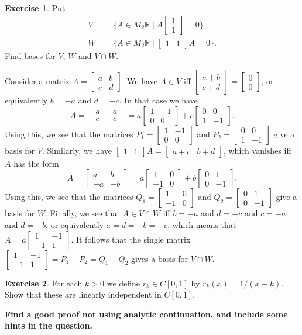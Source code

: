 \documentclass[a4paper]{amsart}
\newcommand{\R}         {{\mathbb{R}}}
\newcommand{\bpm}       {\left[\begin{matrix}}
\newcommand{\epm}       {\end{matrix}\right]}
\newcommand{\st}        {\;|\;}
\renewcommand{\:}{\colon}
\theoremstyle{definition}
\newtheorem{exercise}{Exercise}
\newenvironment{solution}{{\noindent \bf Solution:}}{}
\begin{document}
\begin{exercise}
 Put
 \begin{align*}
  V &= \{A\in M_2\R\st A\bpm 1\\1\epm = 0 \} \\
  W &= \{A\in M_2\R\st \bpm 1&1\epm A = 0 \}. 
 \end{align*} 
 Find bases for $V$, $W$ and $V\cap W$.
\end{exercise}
\begin{solution}
 Consider a matrix $A=\bpm a&b \\ c&d\epm$.  We have $A\in V$ iff
 $\bpm a+b\\ c+d\epm=\bpm 0\\0\epm$, or equivalently $b=-a$ and
 $d=-c$.  In that case we have
 \[ A = \bpm a&-a\\ c&-c\epm = 
        a\bpm 1&-1\\0&0\epm + c\bpm 0&0\\1&-1 \epm.
 \]
 Using this, we see that the matrices $P_1=\bpm 1&-1\\0&0\epm$ and
 $P_2=\bpm 0&0\\1&-1\epm$ give a basis for $V$.  Similarly, we have
 $\bpm 1&1\epm A=\bpm a+c&b+d\epm$, which vanishes iff $A$ has
 the form 
 \[ A = \bpm a&b\\ -a&-b\epm =
     a\bpm 1&0\\-1&0\epm + b\bpm 0&1\\ 0&-1\epm.
 \]
 Using this, we see that the matrices $Q_1=\bpm 1&0\\-1&0\epm$ and
 $Q_2=\bpm 0&1\\0&-1\epm$ give a basis for $W$.  Finally, we see
 that $A\in V\cap W$ iff $b=-a$ and $d=-c$ and $c=-a$ and $d=-b$,
 or equivalently $a=d=-b=-c$, which means that
 $A=a\bpm 1&-1\\-1&1\epm$.  It follows that the single matrix
 $\bpm 1&-1\\-1&1\epm=P_1-P_2=Q_1-Q_2$ gives a basis for
 $V\cap W$.
\end{solution}

\begin{exercise}
 For each $k>0$ we define $r_k\in C[0,1]$ by $r_k(x)=1/(x+k)$. 
 Show that these are linearly independent in $C[0,1]$.
\end{exercise}
\begin{solution}
 \textbf{Find a good proof not using analytic continuation, and 
 include some hints in the question.}
\end{solution}
\end{document}

